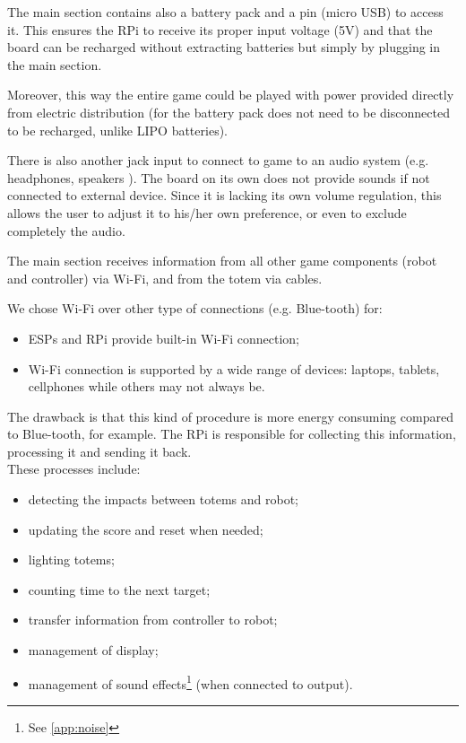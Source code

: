 \documentclass[a4paper,twoside]{book}
\begin{document}
The main section contains also a battery pack and a pin (micro USB) to access it. This ensures the RPi to receive its proper input voltage (5V) and that the board can be recharged without extracting batteries but simply by plugging in the main section.

Moreover, this way the entire game could be played with power provided directly from electric distribution (for the battery pack does not need to be disconnected to be recharged, unlike LIPO batteries).

There is also another jack input to connect to game to an audio system (e.g. headphones, speakers \textellipsis). The board on its own does not provide sounds if not connected to external device. Since it is lacking its own volume regulation, this allows the user to adjust it to his/her own preference, or even to exclude completely the audio.

The main section receives information from all other game components (robot and controller) via Wi-Fi, and from the totem via cables.

We chose Wi-Fi over other type of connections (e.g. Blue-tooth) for:
\begin{itemize}
\item ESPs and RPi provide built-in Wi-Fi connection;
\item Wi-Fi connection is supported by a wide range of devices: laptops, tablets, cellphones \textellipsis while others may not always be. 
\end{itemize}

The drawback is that this kind of procedure is more energy consuming compared to Blue-tooth, for example.
The RPi is responsible for collecting this information, processing it and sending it back.
\\
These processes include:
\begin{itemize}
\item detecting the impacts between totems and robot;
\item updating the score and reset when needed;
\item lighting totems;
\item counting time to the next target;
\item transfer information from controller to robot;
\item management of display;
\item management of sound effects\footnote {See \autoref{app:noise}} (when connected to output).
\end{itemize}
\end{document}
